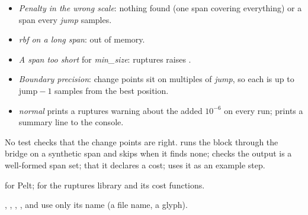 \begin{itemize}
\item \emph{Penalty in the wrong scale}: nothing found (one span covering everything) or
  a span every \emph{jump} samples.
\item \emph{rbf on a long span}: out of memory.
\item \emph{A span too short} for \emph{min\_size}: ruptures raises
  .
\item \emph{Boundary precision}: change points sit on multiples of \emph{jump}, so each is
  up to $\text{jump}-1$ samples from the best position.
\item \emph{normal} prints a ruptures warning about the added $10^{-6}$ on every run;
   prints a summary line to the console.
\end{itemize}

No test checks that the change points are right.  runs the
block through the bridge on a synthetic span and skips when it finds none;
 checks the output is a well-formed span set;
 that it declares a cost; 
uses it as an example step.

\citet{killick2012optimal} for Pelt; \citet{truong2020selective} for the ruptures library
and its cost functions.

, ,
, ,
 and  use only its name
(a file name, a glyph).
